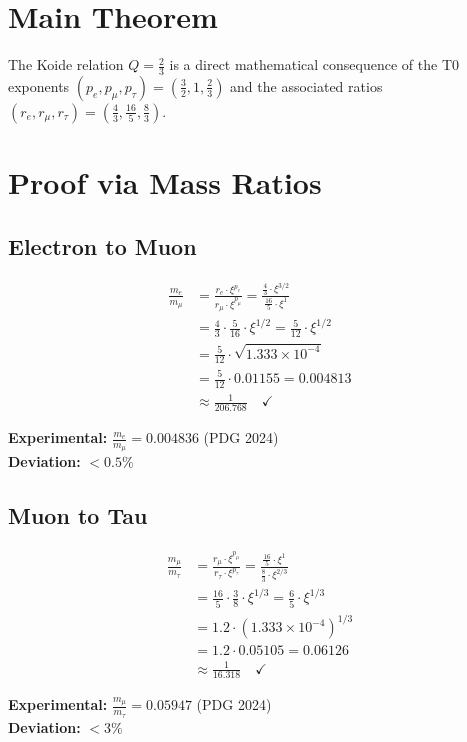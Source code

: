 	\section{Main Theorem}
	
	\begin{theorem}
		The Koide relation $Q = \frac{2}{3}$ is a direct mathematical consequence of the T0 exponents $(p_e, p_\mu, p_\tau) = \left(\frac{3}{2}, 1, \frac{2}{3}\right)$ and the associated ratios $(r_e, r_\mu, r_\tau) = \left(\frac{4}{3}, \frac{16}{5}, \frac{8}{3}\right)$.
	\end{theorem}
	
	\section{Proof via Mass Ratios}
	
	\subsection{Electron to Muon}
	
	\begin{beweis}
		\begin{align}
			\frac{m_e}{m_\mu} &= \frac{r_e \cdot \xi^{p_e}}{r_\mu \cdot \xi^{p_\mu}} = \frac{\frac{4}{3} \cdot \xi^{3/2}}{\frac{16}{5} \cdot \xi^1} \\
			&= \frac{4}{3} \cdot \frac{5}{16} \cdot \xi^{1/2} = \frac{5}{12} \cdot \xi^{1/2} \\
			&= \frac{5}{12} \cdot \sqrt{1.333 \times 10^{-4}} \\
			&= \frac{5}{12} \cdot 0.01155 = 0.004813 \\
			&\approx \frac{1}{206.768} \quad \checkmark
		\end{align}
		
		\textbf{Experimental:} $\frac{m_e}{m_\mu} = 0.004836$ (PDG 2024)\\
		\textbf{Deviation:} $< 0.5\%$
	\end{beweis}
	
	\subsection{Muon to Tau}
	
	\begin{beweis}
		\begin{align}
			\frac{m_\mu}{m_\tau} &= \frac{r_\mu \cdot \xi^{p_\mu}}{r_\tau \cdot \xi^{p_\tau}} = \frac{\frac{16}{5} \cdot \xi^1}{\frac{8}{3} \cdot \xi^{2/3}} \\
			&= \frac{16}{5} \cdot \frac{3}{8} \cdot \xi^{1/3} = \frac{6}{5} \cdot \xi^{1/3} \\
			&= 1.2 \cdot (1.333 \times 10^{-4})^{1/3} \\
			&= 1.2 \cdot 0.05105 = 0.06126 \\
			&\approx \frac{1}{16.318} \quad \checkmark
		\end{align}
		
		\textbf{Experimental:} $\frac{m_\mu}{m_\tau} = 0.05947$ (PDG 2024)\\
		\textbf{Deviation:} $< 3\%$
	\end{beweis}
	
